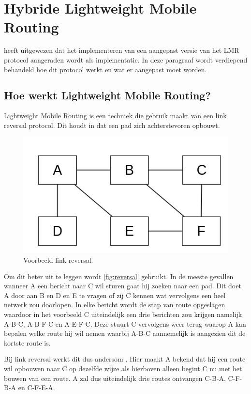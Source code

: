 \documentclass[a4paper, 11pt, oneside]{report}
\begin{document}
\section{Hybride Lightweight Mobile Routing}\label{sec:hybride-lightweight-mobile-routing}

 heeft uitgewezen dat het implementeren van een aangepast versie van het LMR protocol aangeraden wordt als implementatie. In deze paragraaf wordt verdiepend behandeld hoe dit protocol werkt en wat er aangepast moet worden.

\subsection{Hoe werkt Lightweight Mobile Routing?}

Lightweight Mobile Routing is een techniek die gebruik maakt van een link reversal protocol. Dit houdt in dat een pad zich achterstevoren opbouwt.
 
\begin{figure}[H]
	\begin{center}\includegraphics[width=0.45\linewidth]{Afbeeldingen/reversal.png}\end{center}
	\caption{Voorbeeld link reversal.}
	\label{fig:reversal}
\end{figure} 

Om dit beter uit te leggen wordt  \autoref{fig:reversal} gebruikt.
In de meeste gevallen wanneer A een bericht naar C wil sturen gaat hij zoeken naar een pad. 
Dit doet A door aan B en D  en E te vragen of zij C kennen wat vervolgens een heel netwerk zou doorlopen.
In elke bericht wordt de stap van route opgeslagen waardoor in het voorbeeld C uiteindelijk een drie berichten zou krijgen namelijk A-B-C, A-B-F-C en A-E-F-C. Deze stuurt C vervolgens weer terug waarop A kan bepalen welke route hij wil nemen waarbij A-B-C aannemelijk is aangezien dit de kortste route is. 

Bij link reversal werkt dit dus andersom \cite{Vainio_linkreversal}.
Hier maakt A bekend dat hij een route wil opbouwen naar C op dezelfde wijze als hierboven alleen begint C nu met het bouwen van een route. 
A zal dus uiteindelijk drie routes ontvangen C-B-A, C-F-B-A en C-F-E-A.
\end{document}
